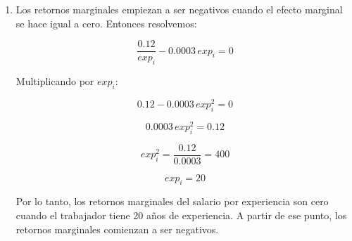 \documentclass[10pt,a4paper]{article}
\begin{document}
\begin{enumerate}
\begin{enumerate}
    \item[d)] Los retornos marginales empiezan a ser negativos cuando el efecto marginal se hace igual a cero. Entonces resolvemos:

    \[
    \frac{0.12}{exp_i} - 0.0003\,exp_i = 0
    \]

    Multiplicando por $exp_i$:

    \[
    0.12 - 0.0003\,exp_i^2 = 0
    \]

    \[
    0.0003\,exp_i^2 = 0.12
    \]

    \[
    exp_i^2 = \frac{0.12}{0.0003} = 400
    \]

    \[
    exp_i = 20
    \]

    Por lo tanto, los retornos marginales del salario por experiencia son cero cuando el trabajador tiene 20 años de experiencia. A partir de ese punto, los retornos marginales comienzan a ser negativos.
\end{enumerate}


\end{enumerate}
\end{document}
